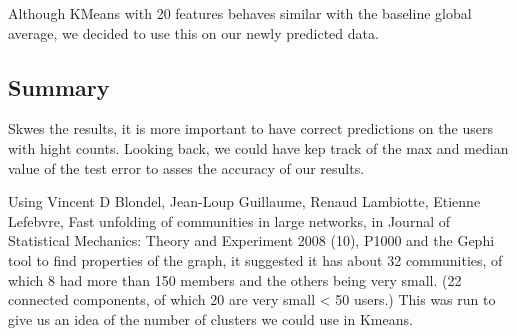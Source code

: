 Although KMeans with 20 features behaves similar with the baseline global average, we decided to use this on our newly predicted data.

\subsection{Summary}
Skwes the results, it is more important to have correct predictions on the users with hight counts. Looking back, we could have kep track of the max and median value of the test error to asses the accuracy of our results.

Using Vincent D Blondel, Jean-Loup Guillaume, Renaud Lambiotte, Etienne Lefebvre, Fast unfolding of communities in large networks, in Journal of Statistical Mechanics: Theory and Experiment 2008 (10), P1000 and the Gephi tool to find properties of the graph, it suggested it has about
32 communities, of which 8 had more than 150 members and the others being very small. (22 connected components, of which 20 are very small < 50 users.) This was run to give us an idea of the number of clusters we could use in Kmeans.


